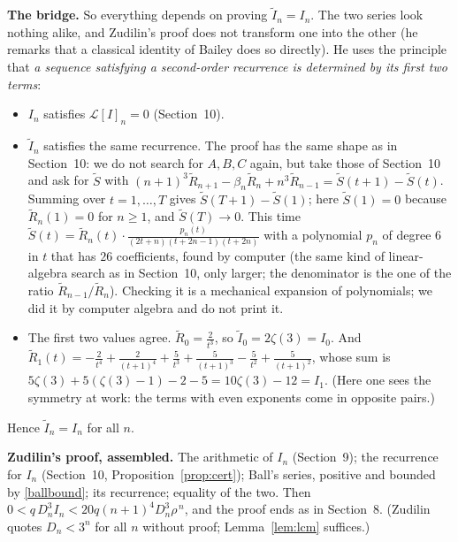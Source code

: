 \documentclass[11pt]{article}
\theoremstyle{remark}
\newcommand{\q}[1]{\medskip\noindent\textbf{#1}}
\begin{document}
\q{The bridge.} So everything depends on proving $\widetilde I_n=I_n$. The two series look nothing
alike, and Zudilin's proof does not transform one into the other (he remarks that a classical
identity of Bailey does so directly). He uses the principle that \emph{a
sequence satisfying a second-order recurrence is determined by its first two terms}:
\begin{itemize}
\item $I_n$ satisfies $\mathcal L[I]_n=0$ (Section~10).
\item $\widetilde I_n$ satisfies the same recurrence. The proof has the same shape as in
Section~10: we do not search for $A,B,C$ again, but take those of Section~10 and ask for $\widetilde S$ with
$(n+1)^3\widetilde R_{n+1}-\beta_n\widetilde R_n+n^3\widetilde R_{n-1}=\widetilde S(t+1)-\widetilde
S(t)$. Summing over $t=1,\dots,T$ gives $\widetilde S(T+1)-\widetilde S(1)$; here
$\widetilde S(1)=0$ because $\widetilde R_n(1)=0$ for $n\ge1$, and $\widetilde S(T)\to0$. This time
$\widetilde S(t)=\widetilde R_n(t)\cdot\frac{p_n(t)}{(2t+n)(t+2n-1)(t+2n)}$ with a polynomial $p_n$
of degree $6$ in $t$ that has $26$ coefficients, found by computer (the same kind of linear-algebra
search as in Section~10, only larger; the denominator is the one of the ratio
$\widetilde R_{n-1}/\widetilde R_n$). Checking it is a mechanical expansion of polynomials; we did
it by computer algebra and do not print it.
\item The first two values agree. $\widetilde R_0=\frac2{t^3}$, so $\widetilde I_0=2\zeta(3)=I_0$. And
$\widetilde R_1(t)=-\frac2{t^4}+\frac2{(t+1)^4}+\frac5{t^3}+\frac5{(t+1)^3}-\frac5{t^2}+\frac5{(t+1)^2}$,
whose sum is $5\zeta(3)+5(\zeta(3)-1)-2-5=10\zeta(3)-12=I_1$. (Here one sees the symmetry at work:
the terms with even exponents come in opposite pairs.)
\end{itemize}
Hence $\widetilde I_n=I_n$ for all $n$.

\q{Zudilin's proof, assembled.} The arithmetic of $I_n$ (Section~9); the recurrence for $I_n$
(Section~10, Proposition~\ref{prop:cert}); Ball's series, positive and bounded by \eqref{ballbound};
its recurrence; equality of the two. Then $0<q\,D_n^3I_n<20q(n+1)^4D_n^3\rho^{\,n}$, and the proof
ends as in Section~8. (Zudilin quotes $D_n<3^n$ for all $n$ without proof; Lemma~\ref{lem:lcm}
suffices.)
\end{document}
